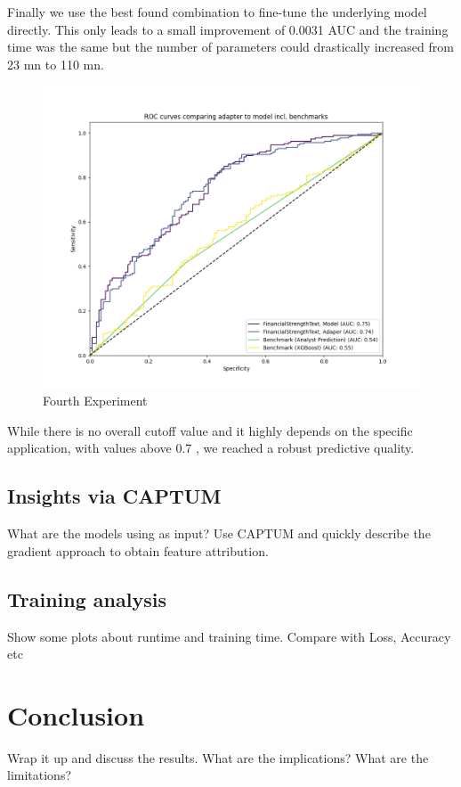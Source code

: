 \documentclass[conference]{IEEEtran}
\begin{document}
Finally we use the best found combination to fine-tune the underlying model directly. This only leads to a small improvement of 0.0031 AUC and the training time was the same but the number of parameters could drastically increased from 23 mn to 110 mn.

\begin{figure}[h!]
    \centering
    \includegraphics[width=.85\linewidth]{../3. evaluation/roc_curves/Fourth Experiment.png}
    \caption[Fourth Experiment]{Fourth Experiment}
    \label{fig:Fourthexp}
\end{figure}

While there is no overall cutoff value and it highly depends on the specific application, with values above 0.7 \cite{Hosmer2013}, we reached a robust predictive quality.

\subsection{Insights via CAPTUM}%
What are the models using as input? Use CAPTUM and quickly describe the gradient approach to obtain feature attribution. \cite{Kokhlikyan2020}


\subsection{Training analysis}%
Show some plots about runtime and training time. Compare with Loss, Accuracy etc

\section{Conclusion}
Wrap it up and discuss the results. What are the implications? What are the limitations?


\end{document}
